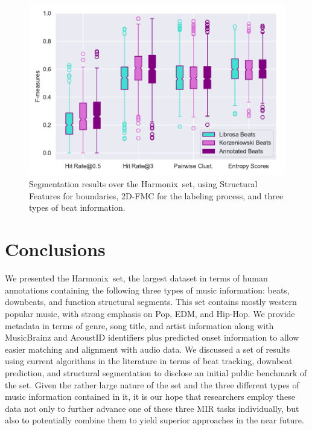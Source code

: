 \documentclass{article}
\newcommand{\setName}{Harmonix}
\begin{document}
\begin{figure}
    \centerline{\includegraphics[width=1.1\columnwidth]{figs/segment_results.pdf}}
    \caption{Segmentation results over the \setName~set, using Structural Features for boundaries, 2D-FMC for the labeling process, and three types of beat information.}
    \label{fig:segment_results}
\end{figure}

\section{Conclusions}\label{sec:conclusions}

We presented the \setName~set, the largest dataset in terms of human annotations containing the following three types of music information: beats, downbeats, and function structural segments.
This set contains mostly western popular music, with strong emphasis on Pop, EDM, and Hip-Hop.
We provide metadata in terms of genre, song title, and artist information along with MusicBrainz and AcoustID identifiers plus predicted onset information to allow easier matching and alignment with audio data.
We discussed a set of results using current algorithms in the literature in terms of beat tracking, downbeat prediction, and structural segmentation to disclose an initial public benchmark of the set.
Given the rather large nature of the set and the three different types of music information contained in it, it is our hope that researchers employ these data not only to further advance one of these three MIR tasks individually, but also to potentially combine them to yield superior approaches in the near future.

\balance

\end{document}

